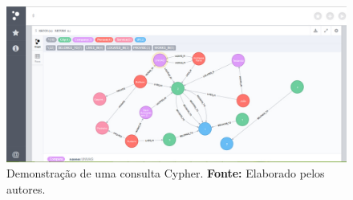 \begin{figure}[h!]
	\centerline{\includegraphics[scale=0.4]{./imagens/neo4j2.jpg}}
	\caption[Demonstração de uma consulta Cypher.]
	{Demonstração de uma consulta Cypher. \textbf{Fonte:} Elaborado pelos autores.}
	\label{fig:exemplo_consulta_neo4j}
\end{figure}